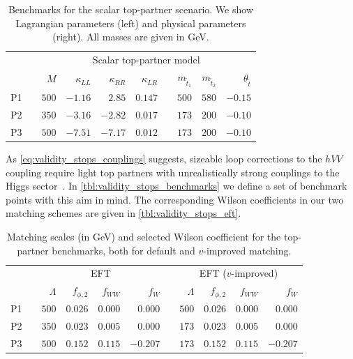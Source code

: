 \begin{table}
\begin{tabular}{c c rrrr c rrr}
  \toprule
  \multirow{2}{*}{}
  && \multicolumn{8}{c}{Scalar top-partner model} \\
  \cmidrule{3-10}
  && $M$ & $\kappa_{LL}$ & $\kappa_{RR}$ & $\kappa_{LR}$
  && $m_{\tilde{t}_{1}}$ & $m_{{\tilde{t}_{2}}}$ & $\theta_{\tilde{t}}$ \\
  \midrule
  P1 && $500$ & $-1.16$ & $2.85$ & $0.147$ && $500$ & $580$ & $-0.15$ \\
  P2 && $350$ & $-3.16$ & $-2.82$ & $0.017$ && $173$ & $200$ & $-0.10$ \\
  P3 && $500$ & $-7.51$ & $-7.17$ & $0.012$ && $173$ & $200$ & $-0.10$ \\
  \bottomrule
 \end{tabular}
 \caption[Benchmarks for the top partners]{Benchmarks for the
   scalar top-partner scenario. We show Lagrangian parameters (left)
   and physical parameters (right). All masses are given in GeV.}
  \label{tbl:validity_stops_benchmarks}
\end{table}

As \autoref{eq:validity_stops_couplings} suggests, sizeable loop
corrections to the $hVV$ coupling require light top partners with
unrealistically strong couplings to the Higgs
sector~\cite{Hollik:2008xn}. In
\autoref{tbl:validity_stops_benchmarks} we define a set of benchmark
points with this aim in mind. The corresponding Wilson coefficients in
our two matching schemes are given in
\autoref{tbl:validity_stops_eft}.

\begin{table}
  \begin{tabular}{c c rrrr c rrrr}
    \toprule
    \multirow{2}{*}{}
    && \multicolumn{4}{c}{EFT} && \multicolumn{4}{c}{EFT ($v$-improved)} \\
    \cmidrule{3-6} \cmidrule{8-11}
    && $\Lambda$ & $f_{\phi,2}$ & $f_{WW}$ & $f_W$
    && $\Lambda$ & $f_{\phi,2}$ & $f_{WW}$ & $f_W$ \\
    \midrule
    P1 && $500$ & $0.026$ & $0.000$ & $0.000$ && $500$ & $0.026$ & $0.000$ & $0.000$\\
    P2 && $350$ & $0.023$ & $0.005$ & $0.000$ && $173$ & $0.023$ & $0.005$ & $0.000$ \\
    P3 && $500$ & $0.152$ & $0.115$ & $-0.207$ && $173$ & $0.152$ & $0.115$ & $-0.207$ \\
    \bottomrule
  \end{tabular}
  \caption[EFT description for the top-partner benchmarks]{Matching
    scales (in GeV) and selected Wilson coefficient
    for the top-partner benchmarks, both for default and $v$-improved
    matching.}
  \label{tbl:validity_stops_eft}
\end{table}

